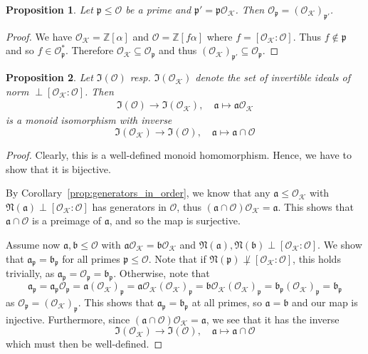 \documentclass{scrartcl}
\newcommand{\N}{\mathbb{N}}
\newcommand{\Z}{\mathbb{Z}}
\newcommand{\K}{\mathcal{K}}
\newcommand{\p}{\mathfrak{p}}
\renewcommand{\a}{\mathfrak{a}}
\renewcommand{\b}{\mathfrak{b}}
\renewcommand{\O}{\mathcal{O}}
\renewcommand{\N}{\mathfrak{N}}
\newtheorem{prop}{Proposition}[section]
\theoremstyle{definition}
\begin{document}
\begin{prop}
    Let $\p \leq \O$ be a prime and $\p' = \p\O_\K$.
    Then $\O_\p = (\O_\K)_{\p'}$.
\end{prop}
\begin{proof}
    We have $\O_\K = \Z[\alpha]$ and $\O = \Z[f\alpha]$ where $f = [\O_\K : \O]$.
    Thus $f \notin \p$ and so $f \in \O_\p^*$.
    Therefore $\O_\K \subseteq \O_\p$ and thus $(\O_\K)_{\p'} \subseteq \O_\p$.
\end{proof}
\begin{prop}
    Let $\mathfrak{I}(\O)$ resp. $\mathfrak{I}(\O_\K)$ denote the set of invertible ideals of norm $\perp [\O_\K : \O]$.
    Then
    \begin{align*}
        \mathfrak{I}(\O) \to \mathfrak{I}(\O_\K), \quad \a \mapsto \a\O_\K
    \end{align*}
    is a monoid isomorphism with inverse
    \begin{equation*}
        \mathfrak{I}(\O_\K) \to \mathfrak{I}(\O), \quad \a \mapsto \a \cap \O
    \end{equation*}
\end{prop}
\begin{proof}
    Clearly, this is a well-defined monoid homomorphism.
    Hence, we have to show that it is bijective.

    By Corollary~\ref{prop:generators_in_order}, we know that any $\a \leq \O_\K$ with $\N(\a) \perp [\O_\K : \O]$ has generators in $\O$, thus $(\a \cap \O)\O_\K = \a$.
    This shows that $\a \cap \O$ is a preimage of $\a$, and so the map is surjective. 

    Assume now $\a, \b \leq \O$ with $\a\O_\K = \b\O_\K$ and $\N(\a), \N(\b) \perp [\O_\K : \O]$.
    We show that $\a_\p = \b_\p$ for all primes $\p \leq \O$.
    Note that if $\N(\p) \not\perp [\O_\K : \O]$, this holds trivially, as $\a_\p = \O_\p = \b_\p$.
    Otherwise, note that
    \begin{equation*}
        \a_\p = \a_\p \O_\p = \a (\O_\K)_\p = \a\O_\K(\O_\K)_\p = \b\O_\K(\O_\K)_\p = \b_\p (\O_\K)_\p = \b_\p
    \end{equation*}
    as $\O_\p = (\O_\K)_\p$.
    This shows that $\a_\p = \b_\p$ at all primes, so $\a = \b$ and our map is injective.
    Furthermore, since $(\a \cap \O)\O_\K = \a$, we see that it has the inverse
    \begin{equation*}
        \mathfrak{I}(\O_\K) \to \mathfrak{I}(\O), \quad \a \mapsto \a \cap \O
    \end{equation*}
    which must then be well-defined.
\end{proof}
\end{document}
